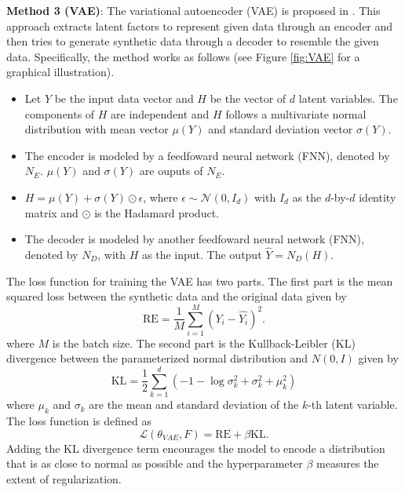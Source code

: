 \documentclass[11pt,a4paper]{article}
\theoremstyle{remark}
\begin{document}
\smallskip	
\noindent \textbf{Method 3 (VAE)}: The variational autoencoder (VAE) is proposed in \cite{kingma2013auto}. This approach extracts latent factors to represent given data through an encoder and then tries to generate synthetic data through a decoder to resemble the given data. Specifically, the method works as follows (see Figure \ref{fig:VAE} for a graphical illustration). 
\begin{itemize}
	\item Let $Y$ be the input data vector and $H$ be the vector of $d$ latent variables. The components of $H$ are independent and $H$ follows a multivariate normal distribution with mean vector $\mu(Y)$ and standard deviation vector $\sigma(Y)$. 
	
	\item The encoder is modeled by a feedfoward neural network (FNN), denoted by $N_E$. $\mu(Y)$ and $\sigma(Y)$ are ouputs of $N_E$.  
	
	\item $H = \mu(Y) + \sigma(Y)\odot\epsilon$, where $\epsilon \sim \mathcal{N}(0, I_{d})$ with $I_d$ as the $d$-by-$d$ identity matrix and $\odot$ is the Hadamard product. 
	
	\item The decoder is modeled by another feedfoward neural network (FNN), denoted by $N_D$, with $H$ as the input. The output $\hat{Y}=N_D(H)$.	
\end{itemize}

The loss function for training the VAE has two parts. The first part is the mean squared loss between the synthetic data and the original data given by
\begin{equation}
	\mathrm{RE}=\frac{1}{M} \sum_{i=1}^{M}\left(Y_{i}-\hat{Y_{i}}\right)^{2}.
\end{equation}
where $M$ is the batch size. The second part is the Kullback-Leibler (KL) divergence between the parameterized normal distribution and $N(0,I)$ given by
\begin{equation}
		\mathrm{KL}=\frac{1}{2} \sum_{k=1}^{d}\left(-1-\log \sigma_{k}^{2}+\sigma_{k}^{2}+\mu_{k}^{2}\right)
\end{equation}
where $\mu_{k}$ and $\sigma_{k}$ are the mean and standard deviation of the $k$-th latent variable. The loss function is defined as
\begin{equation}
		\mathcal{L}(\theta_{VAE}, F) = \mathrm{RE} + \beta\mathrm{KL}.
\end{equation}
Adding the KL divergence term encourages the model to encode a distribution that is as close to normal as possible and the hyperparameter $\beta$ measures the extent of regularization. 
\end{document}
